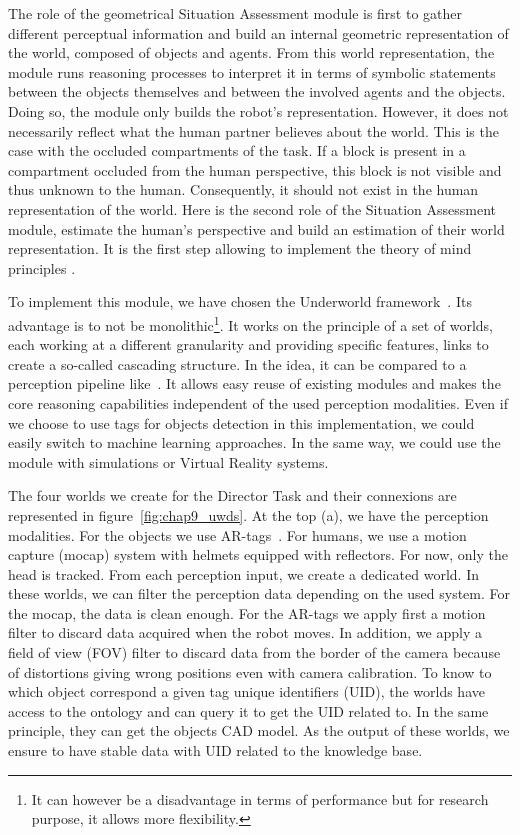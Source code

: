 The role of the geometrical Situation Assessment module is first to gather different perceptual information and build an internal geometric representation of the world, composed of objects and agents. From this world representation, the module runs reasoning processes to interpret it in terms of symbolic statements between the objects themselves and between the involved agents and the objects. Doing so, the module only builds the robot's representation. However, it does not necessarily reflect what the human partner believes about the world. This is the case with the occluded compartments of the task. If a block is present in a compartment occluded from the human perspective, this block is not visible and thus unknown to the human. Consequently, it should not exist in the human representation of the world. Here is the second role of the Situation Assessment module, estimate the human's perspective and build an estimation of their world representation. It is the first step allowing to implement the theory of mind principles \cite{baron_1985_does}.

To implement this module, we have chosen the Underworld framework~\cite{lemaignan_2018_underworlds}. Its advantage is to not be monolithic\footnote{It can however be a disadvantage in terms of performance but for research purpose, it allows more flexibility.}. It works on the principle of a set of worlds, each working at a different granularity and providing specific features, links to create a so-called cascading structure. In the idea, it can be compared to a perception pipeline like~\cite{beetz_2015_robosherlock}. It allows easy reuse of existing modules and makes the core reasoning capabilities independent of the used perception modalities. Even if we choose to use tags for objects detection in this implementation, we could easily switch to machine learning approaches. In the same way, we could use the module with simulations or Virtual Reality systems.

The four worlds we create for the Director Task and their connexions are represented in figure~\ref{fig:chap9_uwds}. At the top (a), we have the perception modalities. For the objects we use AR-tags~\cite{fiala_2005_artag}. For humans, we use a motion capture (mocap) system with helmets equipped with reflectors. For now, only the head is tracked. From each perception input, we create a dedicated world. In these worlds, we can filter the perception data depending on the used system. For the mocap, the data is clean enough. For the AR-tags we apply first a motion filter to discard data acquired when the robot moves. In addition, we apply a field of view (FOV) filter to discard data from the border of the camera because of distortions giving wrong positions even with camera calibration. To know to which object correspond a given tag unique identifiers (UID), the worlds have access to the ontology and can query it to get the UID related to. In the same principle, they can get the objects CAD model. As the output of these worlds, we ensure to have stable data with UID related to the knowledge base.

